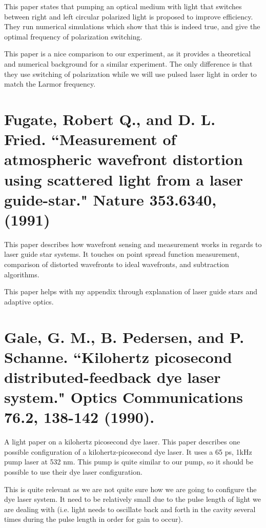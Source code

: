 \documentclass{article}
\begin{document}
This paper states that pumping an optical medium with light that switches between right and left circular polarized light is proposed to improve efficiency. They run numerical simulations which show that this is indeed true, and give the optimal frequency of polarization switching.

This paper is a nice comparison to our experiment, as it provides a theoretical and numerical background for a similar experiment. The only difference is that they use switching of polarization while we will use pulsed laser light in order to match the Larmor frequency.

%

\section*{Fugate, Robert Q., and D. L. Fried. ``Measurement of atmospheric wavefront distortion using scattered light from a laser guide-star." Nature 353.6340, (1991)}

This paper describes how wavefront sensing and measurement works in regards to laser guide star systems. It touches on point spread function measurement, comparison of distorted wavefronts to ideal wavefronts, and subtraction algorithms.

This paper helps with my appendix through explanation of laser guide stars and adaptive optics.

%

\section*{Gale, G. M., B. Pedersen, and P. Schanne. ``Kilohertz picosecond distributed-feedback dye laser system." Optics Communications 76.2, 138-142 (1990).}

A light paper on a kilohertz picosecond dye laser.
This paper describes one possible configuration of a kilohertz-picosecond dye laser. It uses a 65 ps, 1kHz pump laser at 532 nm. This pump is quite similar to our pump, so it should be possible to use their dye laser configuration.

This is quite relevant as we are not quite sure how we are going to configure the dye laser system. It need to be relatively small due to the pulse length of light we are dealing with (i.e. light needs to oscillate back and forth in the cavity several times during the pulse length in order for gain to occur).
\end{document}
